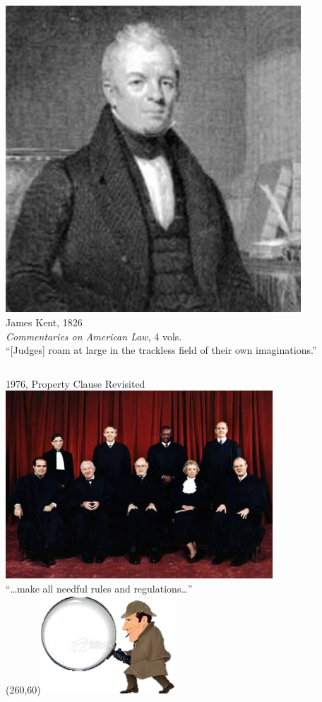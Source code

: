\begin{frame}
    \begin{columns}[onlytextwidth]
            \centering
            \includegraphics[width=0.95\textwidth]{img/james-kent.png} \\
            James Kent, 1826 \\
            \emph{Commentaries on American Law}, 4 vols. \\

            { \large ``[Judges] roam at large in the trackless field of their own imaginations.''}
    \end{columns}
\end{frame}

\begin{frame}{1976, Property Clause Revisited}
    \centering
    \includegraphics[width=0.75\textwidth]{img/sc-1976.png} \\
    ``\ldots make all needful rules and regulations\ldots'' \\
    \Put(260,60){\includegraphics[width=.2\textwidth]{img/sherlock.png}}
\end{frame}

